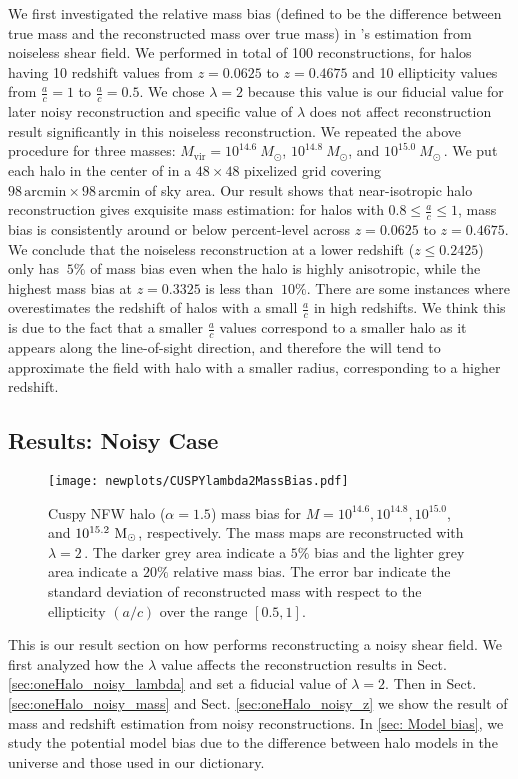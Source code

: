 \documentclass[twocolumn, usenames, dvipsnames]{aastex63}
\begin{document}
We first investigated the relative mass bias (defined to be the difference
between true mass and the reconstructed mass over true mass) in \splinv{}'s
estimation from noiseless shear field.  We performed in total of 100
reconstructions, for halos having 10 redshift values from $z=0.0625$ to
$z=0.4675$ and 10 ellipticity values from $\frac{a}{c}=1$ to $\frac{a}{c}=0.5$.
We chose $\lambda = 2$ because this value is our fiducial value for later noisy
reconstruction and specific value of $\lambda$ does not affect reconstruction
result significantly in this noiseless reconstruction. We repeated the above
procedure for three masses: $M_{\mathrm{vir}} = 10^{14.6}~M_\odot$,
$10^{14.8}~M_\odot$, and $10^{15.0}~M_\odot$\,. We put each halo in the center
of in a $48 \times 48$ pixelized grid covering $98 \,\text{arcmin} \times 98
\,\text{arcmin}$ of sky area. Our result shows that near-isotropic halo
reconstruction gives exquisite mass estimation: for halos with $0.8\leq
\frac{a}{c} \leq 1$, mass bias is consistently around or below percent-level
across $z=0.0625$ to $z=0.4675$. We conclude that the noiseless reconstruction
at a lower redshift ($z\leq 0.2425$) only has $~5\%$ of mass bias even when the
halo is highly anisotropic, while the highest mass bias at $z=0.3325$ is less
than $~10\%$. There are some instances where \splinv{} overestimates the
redshift of halos with a small $\frac{a}{c}$ in high redshifts. We think this
is due to the fact that a smaller $\frac{a}{c}$ values correspond to a smaller
halo as it appears along the line-of-sight direction, and therefore the
\splinv{} will tend to approximate the field with halo with a smaller radius,
corresponding to a higher redshift.

\subsection{Results: Noisy Case}
\label{sec:oneHalo_noisy}

\begin{figure*}
\centering
\texttt{[image: newplots/CUSPYlambda2MassBias.pdf]}
\caption{
    Cuspy NFW halo ($\alpha=1.5$) mass bias for $M=10^{14.6}, 10^{14.8},
    10^{15.0}$, and $10^{15.2}~\textup{M}_{\odot}$, respectively. The mass maps
    are reconstructed with $\lambda=2\,$. The darker grey area indicate a $5\%$
    bias and the lighter grey area indicate a $20\%$ relative mass bias. The
    error bar indicate the standard deviation of reconstructed mass with
    respect to the ellipticity $(a/c)$ over the range $[0.5,1]$.
}
\label{NoisyMassBiasCuspylambda2}
\end{figure*}
This is our result section on how \splinv{} performs reconstructing a noisy
shear field. We first analyzed how the $\lambda$ value affects the
reconstruction results in Sect. \ref{sec:oneHalo_noisy_lambda} and set a
fiducial value of $\lambda=2$. Then in Sect. \ref{sec:oneHalo_noisy_mass} and
Sect. \ref{sec:oneHalo_noisy_z} we show the result of mass and redshift
estimation from noisy reconstructions. In \ref{sec: Model bias}, we study the
potential model bias due to the difference between halo models in the universe
and those used in our dictionary.
\end{document}

